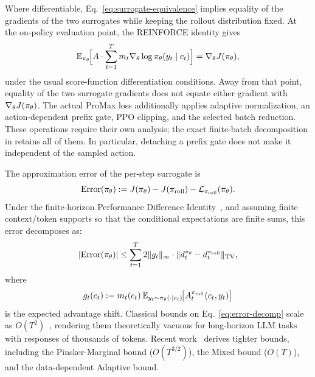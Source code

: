 \begin{remark}
Where differentiable, Eq.~\eqref{eq:surrogate-equivalence} implies equality of the gradients of the two surrogates while keeping the
rollout distribution fixed. At the on-policy evaluation point, the REINFORCE identity gives
\begin{equation*}
    \mathbb{E}_{\pi_{\theta}}\!\Big[A \cdot \sum_{t=1}^T m_t\nabla_\theta \log \pi_{\theta}(y_t \mid c_t)\Big] = \nabla_\theta J(\pi_{\theta}),
\end{equation*}
under the usual score-function differentiation conditions. Away from that point, equality of the two surrogate gradients does not
equate either gradient with $\nabla_\theta J(\pi_{\theta})$.
The actual ProMax loss additionally applies adaptive normalization, an action-dependent prefix gate, PPO clipping, and the selected
batch reduction. These operations require their own analysis; the exact finite-batch decomposition in
 retains all of them. In particular, detaching a prefix gate does not make it independent of the sampled
action.
\end{remark}

The approximation error of the per-step surrogate is
\begin{equation*}
    \mathrm{Error}(\pi_{\theta}) := J(\pi_{\theta}) - J(\pi_{\mathrm{roll}}) - \mathcal{L}_{\pi_{\mathrm{roll}}}(\pi_{\theta}).
\end{equation*}
Under the finite-horizon Performance Difference Identity~\citep{kakade2002approximately},
and assuming finite context/token supports so that the conditional expectations are finite sums,
this error decomposes as:
\begin{equation}
    |\mathrm{Error}(\pi_{\theta})| \le \sum_{t=1}^T 2\|g_t\|_\infty \cdot \|d_t^{\pi_{\theta}} - d_t^{\pi_{\mathrm{roll}}}\|_{\mathrm{TV}},
    \label{eq:error-decomp}
\end{equation}
where
\begin{equation*}
    g_t(c_t) := m_t(c_t)\,\mathbb{E}_{y_t \sim \pi_{\theta}(\cdot\mid c_t)}\!\big[A_t^{\pi_{\mathrm{roll}}}(c_t, y_t)\big]
\end{equation*}
is the expected advantage shift. Classical bounds on Eq.~\eqref{eq:error-decomp} scale as $O(T^2)$~\citep{kakade2002approximately,
achiam2017constrained}, rendering them theoretically vacuous for long-horizon LLM tasks with responses of thousands of tokens. Recent
work~\citep{li2025trm} derives tighter bounds,
including the Pinsker-Marginal bound ($O(T^{3/2})$), the Mixed bound ($O(T)$), and the data-dependent Adaptive bound.

